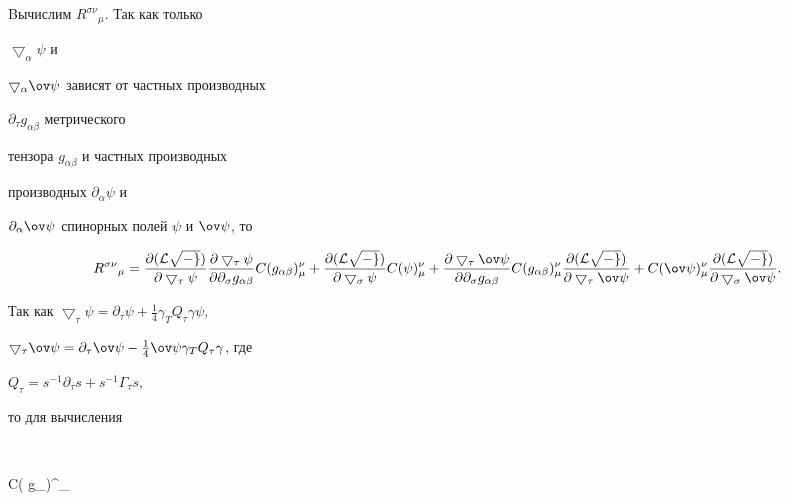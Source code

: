 Bычислим $R^{\sigma\nu}{}_\mu$. Так как только


$\bigtriangledown_\alpha\psi$ и


$\bigtriangledown_\alpha\ov\psi$ зависят от частных производных


$\partial_\tau g_{\alpha\beta}$ метрического


тензора $g_{\alpha\beta}$ и частных производных


производных $\partial_\alpha\psi$ и


$\partial_\alpha\ov\psi$ спинорных полей $\psi$ и $\ov\psi$, то


$$


R^{\sigma\nu}{}_\mu=


\frac{\partial( \cal L\sqrt{-g})}{\partial\bigtriangledown_\tau\psi}


\frac{\partial\bigtriangledown_\tau\psi}{\partial\partial_\sigma


g_{\alpha\beta}}C( g_{\alpha\beta})^\nu_\mu+


\frac{\partial(\cal L\sqrt{-g})}{\partial\bigtriangledown_\sigma\psi}


C( \psi)^\nu_\mu+


\frac{\partial\bigtriangledown_\tau\ov\psi}{\partial\partial_\sigma


g_{\alpha\beta}}C( g_{\alpha\beta})^\nu_\mu


\frac{\partial( \cal L\sqrt{-g})}{\partial\bigtriangledown_\tau


\ov\psi}+C(\ov \psi)^\nu_\mu


\frac{\partial( \cal L\sqrt{-g})}{\partial\bigtriangledown_


\sigma\ov\psi}.


$$


Так как $\bigtriangledown_\tau\psi=\partial_\tau\psi+


\frac{1}{4}\gamma_TQ_\tau\gamma\psi$, 


$\bigtriangledown_\tau\ov\psi=\partial_\tau\ov\psi-


\frac{1}{4}\ov\psi\gamma_TQ_\tau\gamma$, где


$Q_\tau=s^{-1}\partial_\tau s+s^{-1}\Gamma_\tau s$, 


то для вычисления


$$




C( g_{\alpha\beta})^\nu_\mu


